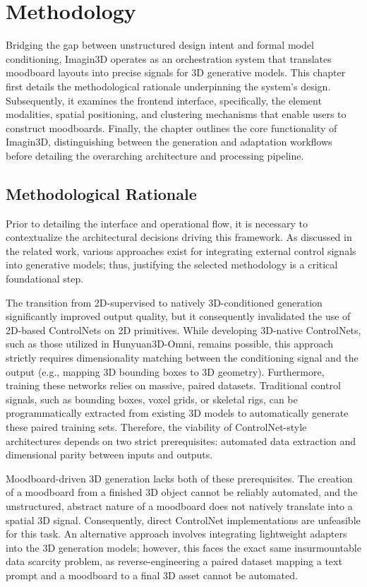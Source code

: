 \chapter{Methodology}
\label{chap:metho}

Bridging the gap between unstructured design intent and formal model conditioning, Imagin3D operates as an orchestration system that translates moodboard layouts into precise signals for 3D generative models. This chapter first details the methodological rationale underpinning the system's design. Subsequently, it examines the frontend interface, specifically, the element modalities, spatial positioning, and clustering mechanisms that enable users to construct moodboards. Finally, the chapter outlines the core functionality of Imagin3D, distinguishing between the generation and adaptation workflows before detailing the overarching architecture and processing pipeline.

\section{Methodological Rationale}

Prior to detailing the interface and operational flow, it is necessary to contextualize the architectural decisions driving this framework. As discussed in the related work, various approaches exist for integrating external control signals into generative models; thus, justifying the selected methodology is a critical foundational step.

The transition from 2D-supervised to natively 3D-conditioned generation significantly improved output quality, but it consequently invalidated the use of 2D-based ControlNets on 2D primitives. While developing 3D-native ControlNets, such as those utilized in Hunyuan3D-Omni, remains possible, this approach strictly requires dimensionality matching between the conditioning signal and the output (e.g., mapping 3D bounding boxes to 3D geometry). Furthermore, training these networks relies on massive, paired datasets. Traditional control signals, such as bounding boxes, voxel grids, or skeletal rigs, can be programmatically extracted from existing 3D models to automatically generate these paired training sets. Therefore, the viability of ControlNet-style architectures depends on two strict prerequisites: automated data extraction and dimensional parity between inputs and outputs.

Moodboard-driven 3D generation lacks both of these prerequisites. The creation of a moodboard from a finished 3D object cannot be reliably automated, and the unstructured, abstract nature of a moodboard does not natively translate into a spatial 3D signal. Consequently, direct ControlNet implementations are unfeasible for this task. An alternative approach involves integrating lightweight adapters into the 3D generation models; however, this faces the exact same insurmountable data scarcity problem, as reverse-engineering a paired dataset mapping a text prompt and a moodboard to a final 3D asset cannot be automated.

